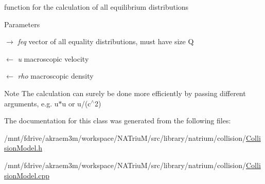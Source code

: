 function for the calculation of all equilibrium distributions 
\begin{DoxyParams}{Parameters}
\item[\mbox{$\rightarrow$} {\em feq}]vector of all equality distributions, must have size Q \item[\mbox{$\leftarrow$} {\em u}]macroscopic velocity \item[\mbox{$\leftarrow$} {\em rho}]macroscopic density \end{DoxyParams}
\begin{DoxyNote}{Note}
The calculation can surely be done more efficiently by passing different arguments, e.g. u$\ast$u or u/(c$^\wedge$2) 
\end{DoxyNote}


The documentation for this class was generated from the following files:\begin{DoxyCompactItemize}
\item 
/mnt/fdrive/akraem3m/workspace/NATriuM/src/library/natrium/collision/\hyperlink{CollisionModel_8h}{CollisionModel.h}\item 
/mnt/fdrive/akraem3m/workspace/NATriuM/src/library/natrium/collision/\hyperlink{CollisionModel_8cpp}{CollisionModel.cpp}\end{DoxyCompactItemize}
